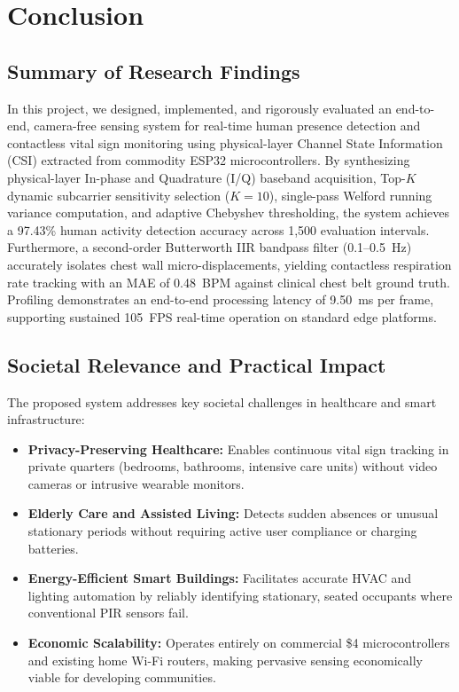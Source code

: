 \chapter{Conclusion}
\label{chap:conclusion}

\section{Summary of Research Findings}
In this project, we designed, implemented, and rigorously evaluated an end-to-end, camera-free sensing system for real-time human presence detection and contactless vital sign monitoring using physical-layer Channel State Information (CSI) extracted from commodity ESP32 microcontrollers. By synthesizing physical-layer In-phase and Quadrature (I/Q) baseband acquisition, Top-$K$ dynamic subcarrier sensitivity selection ($K=10$), single-pass Welford running variance computation, and adaptive Chebyshev thresholding, the system achieves a 97.43\% human activity detection accuracy across 1,500 evaluation intervals. Furthermore, a second-order Butterworth IIR bandpass filter (0.1--0.5~Hz) accurately isolates chest wall micro-displacements, yielding contactless respiration rate tracking with an MAE of 0.48~BPM against clinical chest belt ground truth. Profiling demonstrates an end-to-end processing latency of 9.50~ms per frame, supporting sustained 105~FPS real-time operation on standard edge platforms.

\section{Societal Relevance and Practical Impact}
The proposed system addresses key societal challenges in healthcare and smart infrastructure:
\begin{itemize}
    \item \textbf{Privacy-Preserving Healthcare:} Enables continuous vital sign tracking in private quarters (bedrooms, bathrooms, intensive care units) without video cameras or intrusive wearable monitors.
    \item \textbf{Elderly Care and Assisted Living:} Detects sudden absences or unusual stationary periods without requiring active user compliance or charging batteries.
    \item \textbf{Energy-Efficient Smart Buildings:} Facilitates accurate HVAC and lighting automation by reliably identifying stationary, seated occupants where conventional PIR sensors fail.
    \item \textbf{Economic Scalability:} Operates entirely on commercial \$4 microcontrollers and existing home Wi-Fi routers, making pervasive sensing economically viable for developing communities.
\end{itemize}

